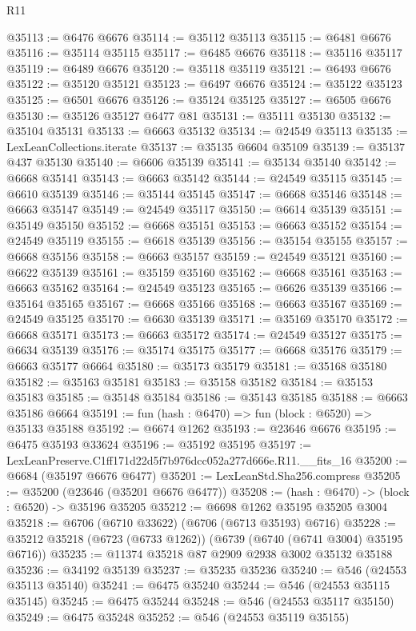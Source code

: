 \begin{lexlean}{R11}
\begin{coremodule}
@35113 := @6476 @6676
@35114 := @35112 @35113
@35115 := @6481 @6676
@35116 := @35114 @35115
@35117 := @6485 @6676
@35118 := @35116 @35117
@35119 := @6489 @6676
@35120 := @35118 @35119
@35121 := @6493 @6676
@35122 := @35120 @35121
@35123 := @6497 @6676
@35124 := @35122 @35123
@35125 := @6501 @6676
@35126 := @35124 @35125
@35127 := @6505 @6676
@35130 := @35126 @35127 @6477 @81
@35131 := @35111 @35130
@35132 := @35104 @35131
@35133 := @6663 @35132
@35134 := @24549 @35113
@35135 := LexLeanCollections.iterate
@35137 := @35135 @6604 @35109
@35139 := @35137 @437 @35130
@35140 := @6606 @35139
@35141 := @35134 @35140
@35142 := @6668 @35141
@35143 := @6663 @35142
@35144 := @24549 @35115
@35145 := @6610 @35139
@35146 := @35144 @35145
@35147 := @6668 @35146
@35148 := @6663 @35147
@35149 := @24549 @35117
@35150 := @6614 @35139
@35151 := @35149 @35150
@35152 := @6668 @35151
@35153 := @6663 @35152
@35154 := @24549 @35119
@35155 := @6618 @35139
@35156 := @35154 @35155
@35157 := @6668 @35156
@35158 := @6663 @35157
@35159 := @24549 @35121
@35160 := @6622 @35139
@35161 := @35159 @35160
@35162 := @6668 @35161
@35163 := @6663 @35162
@35164 := @24549 @35123
@35165 := @6626 @35139
@35166 := @35164 @35165
@35167 := @6668 @35166
@35168 := @6663 @35167
@35169 := @24549 @35125
@35170 := @6630 @35139
@35171 := @35169 @35170
@35172 := @6668 @35171
@35173 := @6663 @35172
@35174 := @24549 @35127
@35175 := @6634 @35139
@35176 := @35174 @35175
@35177 := @6668 @35176
@35179 := @6663 @35177 @6664
@35180 := @35173 @35179
@35181 := @35168 @35180
@35182 := @35163 @35181
@35183 := @35158 @35182
@35184 := @35153 @35183
@35185 := @35148 @35184
@35186 := @35143 @35185
@35188 := @6663 @35186 @6664
@35191 := fun (hash : @6470) => fun (block : @6520) => @35133 @35188
@35192 := @6674 @1262
@35193 := @23646 @6676
@35195 := @6475 @35193 @33624
@35196 := @35192 @35195
@35197 := LexLeanPreserve.C1ff171d22d5f7b976dcc052a277d666e.R11.__fits_16
@35200 := @6684 (@35197 @6676 @6477)
@35201 := LexLeanStd.Sha256.compress
@35205 := @35200 (@23646 (@35201 @6676 @6477))
@35208 := (hash : @6470) -> (block : @6520) -> @35196 @35205
@35212 := @6698 @1262 @35195 @35205 @3004
@35218 := @6706 (@6710 @33622) (@6706 (@6713 @35193) @6716)
@35228 := @35212 @35218 (@6723 (@6733 @1262)) (@6739 (@6740 (@6741 @3004) @35195 @6716))
@35235 := @11374 @35218 @87 @2909 @2938 @3002 @35132 @35188
@35236 := @34192 @35139
@35237 := @35235 @35236
@35240 := @546 (@24553 @35113 @35140)
@35241 := @6475 @35240
@35244 := @546 (@24553 @35115 @35145)
@35245 := @6475 @35244
@35248 := @546 (@24553 @35117 @35150)
@35249 := @6475 @35248
@35252 := @546 (@24553 @35119 @35155)

\end{coremodule}
\end{lexlean}
